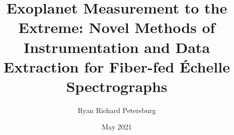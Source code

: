 \documentclass[12pt]{yalephd}
\begin{document}
\titlespacing*{\chapter}{0pt}{50pt}{30pt}%

	\title{Exoplanet Measurement to the Extreme: Novel Methods of Instrumentation and Data Extraction for Fiber-fed \'Echelle Spectrographs}
	\author{Ryan Richard Petersburg}
	\date{May 2021}


    
	
    \maketitle
    \makecopyright
	
    
    
	
    \tableofcontents
    \listoffigures
    \listoftables
    
    \mainmatter      %

	
	
	
	
	
	

    
    
    
\end{document}
